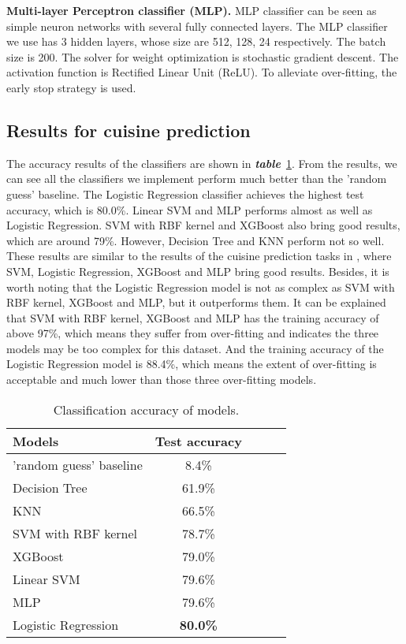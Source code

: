 \documentclass{article}
\begin{document}
\textbf{Multi-layer Perceptron classifier (MLP).}
MLP classifier can be seen as simple neuron networks with several fully connected layers. The MLP classifier we use has 3 hidden layers, whose size are 512, 128, 24 respectively. The batch size is 200. The solver for weight optimization is stochastic gradient descent. The activation function is Rectified Linear Unit (ReLU). To alleviate over-fitting, the early stop strategy is used.

\subsection{Results for cuisine prediction}
The accuracy results of the classifiers are shown in \emph{\textbf{table}}~\ref{acc}. From the results, we can see all the classifiers we implement perform much better than the ’random guess’ baseline. The Logistic Regression classifier achieves the highest test accuracy, which is 80.0\%. Linear SVM and MLP performs almost as well as Logistic Regression. SVM with RBF kernel and XGBoost also bring good results, which are around 79\%. However, Decision Tree and KNN perform not so well. These results are similar to the results of the cuisine prediction tasks in \cite{ghewari2015predicting} \cite{jayaraman2017analysis} \cite{kumar2016cuisine} \cite{kalajdziski2018cuisine}, where SVM, Logistic Regression, XGBoost and MLP bring good results. Besides, it is worth noting that the Logistic Regression model is not as complex as SVM with RBF kernel, XGBoost and MLP, but it outperforms them. It can be explained that SVM with RBF kernel, XGBoost and MLP has the training accuracy of above 97\%, which means they suffer from over-fitting and indicates the three models may be too complex for this dataset. And the training accuracy of the Logistic Regression model is 88.4\%, which means the extent of over-fitting is acceptable and much lower than those three over-fitting models.

\begin{table}[htb]
\vskip -2mm
\begin{center}
\begin{tabular}{lcccc}
\hline
Models & Test accuracy \\
\hline
'random guess' baseline &  8.4\% \\
Decision Tree & 61.9\% \\
KNN & 66.5\% \\
SVM with RBF kernel  & 78.7\% \\
XGBoost & 79.0\% \\
Linear SVM &  79.6\% \\
MLP & 79.6\% \\
Logistic Regression  & \textbf{80.0\%} \\
\hline
\end{tabular}
\vskip 0.5mm
\caption{Classification accuracy of models.}
\label{acc}
\end{center}
\vskip -5mm
\end{table}
\end{document}
